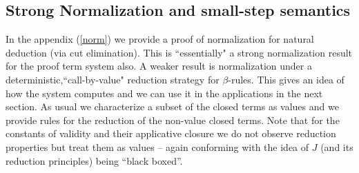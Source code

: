         \subsection{Strong Normalization and small-step semantics}
        In the appendix (\ref{norm}) we provide a proof of normalization for  natural deduction (via cut elimination). 
        This is ``essentially" a strong normalization result for the proof term system also. A  weaker result is 
        normalization under a  deterministic,``call-by-value" reduction strategy for $\beta$-rules.
        This   gives
        an idea of how the system computes  and we can use it in the applications in the next section. 
        As usual we characterize a subset of the closed terms as values and we provide rules for the reduction of the non-value closed terms.
        Note that for the constants of validity and their applicative closure we do not observe reduction properties but treat them as values -- again conforming with the idea of $J$ (and its reduction principles) being ``black boxed''.
